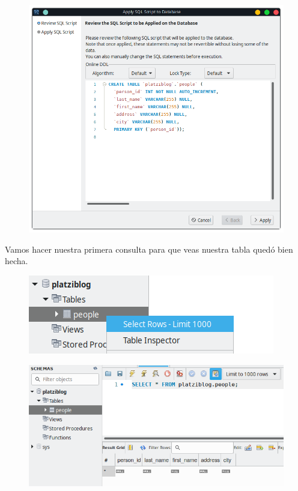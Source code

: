 \documentclass{article}
\begin{document}
\begin{figure}[h!]
  \centering
  \includegraphics[scale=0.65]{./Pictures/047_people_apply.png}
\end{figure}

\newpage
Vamos hacer nuestra primera consulta para que veas nuestra tabla quedó bien hecha.\\

\begin{figure}[h!]
  \centering
  \includegraphics[scale=0.75]{./Pictures/048_selec.png}
\end{figure}

\begin{figure}[h!]
  \centering
  \includegraphics[scale=0.75]{./Pictures/049_select.png}
\end{figure}
\end{document}
